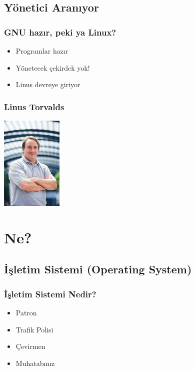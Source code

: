 \documentclass{beamer}
\begin{document}
	\subsection{Yönetici Aranıyor}
		\begin{frame}
		 	\frametitle{GNU hazır, peki ya Linux?}
				\begin{itemize}[<+->]
				\item Programlar hazır
				\item Yönetecek çekirdek yok!
				\item Linus devreye giriyor
				\end{itemize}
		\end{frame}
		\begin{frame}
		 	\frametitle{Linus Torvalds}
				\begin{center}
					\includegraphics{linus.jpg}
				\end{center}
		\end{frame}
		



\section{Ne?}
	\subsection{İşletim Sistemi (Operating System)}
		\begin{frame}
			\frametitle{İşletim Sistemi Nedir?}
			\begin{itemize}[<+->]
			 \item Patron
			 \item Trafik Polisi 
			 \item Çevirmen
			 \item Muhatabınız 
			\end{itemize}

		\end{frame}
\end{document}
